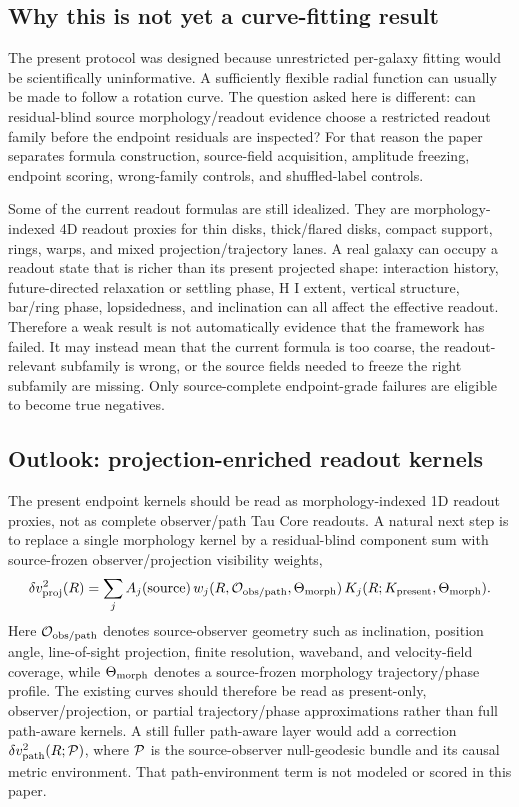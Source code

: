 \documentclass[11pt]{article}
\begin{document}
\subsection{Why this is not yet a curve-fitting result}

The present protocol was designed because unrestricted per-galaxy fitting would
be scientifically uninformative.  A sufficiently flexible radial function can
usually be made to follow a rotation curve.  The question asked here is
different: can residual-blind source morphology/readout evidence choose a
restricted readout family before the endpoint residuals are inspected?  For
that reason the paper separates
formula construction, source-field acquisition, amplitude freezing, endpoint
scoring, wrong-family controls, and shuffled-label controls.

Some of the current readout formulas are still idealized.  They are
morphology-indexed 4D readout proxies for thin disks, thick/flared disks,
compact support, rings, warps, and mixed projection/trajectory lanes.  A real
galaxy can occupy a readout state that is richer than its present projected
shape: interaction history, future-directed relaxation or settling phase, H I
extent, vertical structure, bar/ring phase, lopsidedness, and inclination can
all affect the effective readout.
Therefore a weak result is not automatically evidence that the framework has
failed.  It may instead mean that the current formula is too coarse, the
readout-relevant subfamily is wrong, or the source fields needed to freeze the
right subfamily are missing.  Only source-complete endpoint-grade failures are
eligible to become true negatives.

\subsection{Outlook: projection-enriched readout kernels}

The present endpoint kernels should be read as morphology-indexed 1D readout
proxies, not as complete observer/path Tau Core readouts.  A natural next step
is to replace a single morphology kernel by a residual-blind component sum with
source-frozen observer/projection visibility weights,
\[
\delta v^2_{\rm proj}(R)
=
\sum_j
A_j({\rm source})\,
w_j(R,{\cal O}_{\rm obs/path},\Theta_{\rm morph})\,
K_j(R;K_{\rm present},\Theta_{\rm morph}) .
\]
Here \({\cal O}_{\rm obs/path}\) denotes source-observer geometry such as
inclination, position angle, line-of-sight projection, finite resolution,
waveband, and velocity-field coverage, while \(\Theta_{\rm morph}\) denotes a
source-frozen morphology trajectory/phase profile.  The existing curves should
therefore be read as present-only, observer/projection, or partial
trajectory/phase approximations rather than full path-aware kernels.  A still
fuller path-aware layer would add a
correction \(\delta v^2_{\rm path}(R;{\cal P})\), where \({\cal P}\) is the
source-observer null-geodesic bundle and its causal metric environment.  That
path-environment term is not modeled or scored in this paper.
\end{document}
